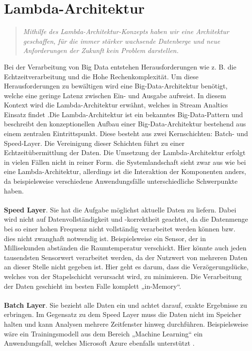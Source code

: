 \section{Lambda-Architektur}

\begin{quote} \textit{\glqq Mithilfe des Lambda-Architektur-Konzepts haben wir eine Architektur geschaffen, für die immer stärker wachsende Datenberge und neue Anforderungen der Zukunft kein Problem darstellen. \grqq~}\cite[S.2]{opitz.2017} \\ \end{quote} 
Bei der Verarbeitung von Big Data entstehen Herausforderungen wie z. B. die Echtzeitverarbeitung und die Hohe Rechenkomplexität. Um diese Herausforderungen zu bewältigen wird eine Big-Data-Architektur benötigt, welche eine geringe Latenz zwischen Ein- und Ausgabe aufweist. In diesem Kontext wird die Lambda-Architektur erwähnt, welches in Stream Analtics Einsatz findet \cite{Familiar.2017}.Die  Lambda-Architektur ist ein bekanntes Big-Data-Pattern und beschreibt den  konzeptionellen  Aufbau  einer  Big-Data-Architektur bestehend  aus  einem  zentralen  Eintrittspunkt. Diese besteht aus zwei Kernschichten: Batch- und Speed-Layer. Die Vereinigung dieser Schichten führt zu einer Echtzeitübermittlung der Daten. Die Umsetzung der Lambda-Architektur erfolgt in vielen Fällen nicht in reiner Form. die Systemlandschaft sieht zwar aus wie bei eine Lambda-Architektur, allerdings ist die Interaktion der Komponenten anders, da beispielsweise verschiedene Anwendungsfälle unterschiedliche Schwerpunkte haben.  \\ \\ \textbf{Speed Layer}. Sie hat die Aufgabe möglichst aktuelle Daten zu liefern. Dabei wird nicht auf Datenvollständigkeit und -korrektheit geachtet, da die Datenmenge bei so einer hohen Frequenz nicht vollständig verarbeitet werden können bzw. dies nicht zwanghaft notwendig ist. Beispielsweise ein Sensor, der in Millisekunden abständen die Raumtemperatur verschickt. Hier könnte auch jeden tausendsten Sensorwert verarbeitet werden, da der Nutzwert von mehreren Daten an dieser Stelle nicht gegeben ist. Hier geht es darum, dass die Verzögerungslücke, welches von der Stapelschicht verursacht wird, zu minimieren. Die Verarbeitung der Daten geschieht im besten Falle komplett „in-Memory“.\\ \\ \textbf{Batch Layer}. Sie bezieht alle Daten ein und achtet darauf, exakte Ergebnisse zu erbringen. Im Gegensatz zu dem Speed Layer muss die Daten nicht im Speicher halten und kann Analysen mehrere Zeitfenster hinweg durchführen. Beispielsweise wäre ein Trainingsmodell aus dem Bereich „Machine Learning“ ein Anwendungsfall, welches Microsoft Azure ebenfalls unterstützt \cite{Berle.2017}. 

